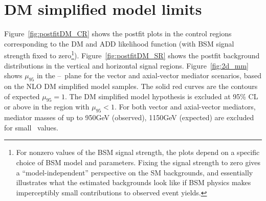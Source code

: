 \section{DM simplified model limits} \label{sec:results_DM}
Figure~\ref{fig:postfitDM_CR} shows the postfit plots in the control regions corresponding to the DM and ADD likelihood function (with
BSM signal strength fixed to zero\footnote{For nonzero values of the BSM signal strength, the plots depend on a specific choice of BSM model
and parameters. Fixing the signal strength to zero gives a ``model-independent'' perspective on the SM backgrounds,
and essentially illustrates what the estimated backgrounds look like if BSM physics makes imperceptibly
small contributions to observed event yields.}).
Figure~\ref{fig:postfitDM_SR} shows the postfit background distributions in the vertical and horizontal signal regions.
Figure~\ref{fig:2d_mm} shows $\mu_{95}$ in the \mmed--\mdm\ plane for the  vector and
axial-vector mediator scenarios, based on the NLO DM simplified model samples. The solid red curves are the
contours of expected $\mu_{95} = 1$. The DM simplified model hypothesis is excluded at 95\% CL or above in the region with $\mu_{95} < 1$.
For both vector and axial-vector mediators, mediator masses of up to 950\unit{GeV} (observed), 1150\unit{GeV} (expected) are excluded
for small \mdm\ values.

